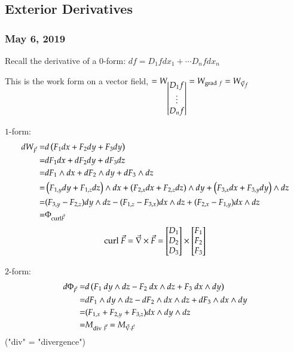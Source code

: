 \subsection{Exterior Derivatives}
\subsubsection*{May 6, 2019}
Recall the derivative of a $0$-form: $df=D_1 f dx_1 + \cdots D_n f dx_n$

This is the work form on a vector field, $=W_{\begin{bmatrix} D_1f \\ \vdots \\ D_nf \end{bmatrix}}=W_{\mathrm{grad}\ f} = W_{\vec{\nabla} f}$

$1$-form: 
\begin{align*}
	dW_{\vec{F}}=&d\left( F_1dx + F_2dy + F_3dy \right)\\
	=& dF_1dx + dF_2dy + dF_3dz \\
	=& dF_1\wedge dx + dF_2\wedge dy + dF_3\wedge dz \\
	=& \left( F_{1,y}dy+F_{1,z}dz \right)\land dx + \left( F_{2,x}dx+F_{2,z}dz \right)\land dy + \left( F_{3,x}dx + F_{3,y}dy \right)\land dz \\
	=& (F_{3,y}-F_{2,z})dy\wedge dz - (F_{1,z}-F_{3,x})dx\wedge dz + (F_{2,x}-F_{1,y})dx\wedge dz \\
	=&\Phi_{\mathrm{curl} \vec{F}}
\end{align*}
\[\mathrm{curl}\ \vec{F}=\vec{\nabla}\times \vec{F}=\mtrx{D_1 \\ D_2 \\ D_3}\times \mtrx{F_1 \\ F_2 \\ F_3}\]

$2$-form: 
\begin{align*}
	d\Phi_{\vec{F}} =& d\left( F_1\ dy\land dz - F_2\ dx\wedge dz + F_3\ dx\wedge dy \right) \\
	=& dF_1\wedge dy\wedge dz - dF_2\wedge dx\wedge dz+ dF_3\wedge dx\wedge dy \\
	=& (F_{1,x}+F_{2,y}+F_{3,z})dx\wedge dy \wedge dz \\
	=& M_{\mathrm{div}\ \vec{F}}=M_{\vec{\nabla}\cdot \vec{F}}
\end{align*} 
("div" = "divergence")


